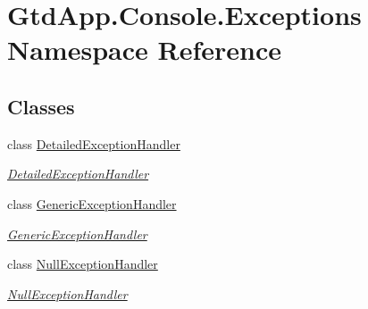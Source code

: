 \hypertarget{namespace_gtd_app_1_1_console_1_1_exceptions}{}\section{Gtd\+App.\+Console.\+Exceptions Namespace Reference}
\label{namespace_gtd_app_1_1_console_1_1_exceptions}
\subsection*{Classes}
\begin{DoxyCompactItemize}
\item 
class \mbox{\hyperlink{class_gtd_app_1_1_console_1_1_exceptions_1_1_detailed_exception_handler}{Detailed\+Exception\+Handler}}
\begin{DoxyCompactList}\small\item\em \mbox{\hyperlink{class_gtd_app_1_1_console_1_1_exceptions_1_1_detailed_exception_handler}{Detailed\+Exception\+Handler}} \end{DoxyCompactList}\item 
class \mbox{\hyperlink{class_gtd_app_1_1_console_1_1_exceptions_1_1_generic_exception_handler}{Generic\+Exception\+Handler}}
\begin{DoxyCompactList}\small\item\em \mbox{\hyperlink{class_gtd_app_1_1_console_1_1_exceptions_1_1_generic_exception_handler}{Generic\+Exception\+Handler}} \end{DoxyCompactList}\item 
class \mbox{\hyperlink{class_gtd_app_1_1_console_1_1_exceptions_1_1_null_exception_handler}{Null\+Exception\+Handler}}
\begin{DoxyCompactList}\small\item\em \mbox{\hyperlink{class_gtd_app_1_1_console_1_1_exceptions_1_1_null_exception_handler}{Null\+Exception\+Handler}} \end{DoxyCompactList}\end{DoxyCompactItemize}
